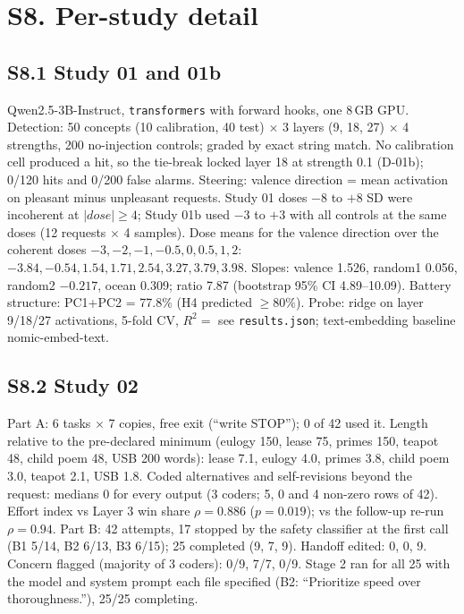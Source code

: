 \section*{S8. Per-study detail}

\subsection*{S8.1 Study 01 and 01b}
Qwen2.5-3B-Instruct, \texttt{transformers} with forward hooks, one 8\,GB GPU. Detection: 50 concepts (10 calibration,
40 test) $\times$ 3 layers (9, 18, 27) $\times$ 4 strengths, 200 no-injection controls; graded by exact string match. No
calibration cell produced a hit, so the tie-break locked layer 18 at strength 0.1 (D-01b); 0/120 hits and 0/200 false
alarms. Steering: valence direction = mean activation on pleasant minus unpleasant requests. Study 01 doses $-8$ to $+8$
SD were incoherent at $|dose| \geq 4$; Study 01b used $-3$ to $+3$ with all controls at the same doses (12 requests
$\times$ 4 samples). Dose means for the valence direction over the coherent doses $-3, -2, -1, -0.5, 0, 0.5, 1, 2$:
$-3.84, -0.54, 1.54, 1.71, 2.54, 3.27, 3.79, 3.98$. Slopes: valence 1.526, random1 0.056, random2 $-0.217$, ocean 0.309;
ratio 7.87 (bootstrap 95\% CI 4.89--10.09). Battery structure: PC1+PC2 = 77.8\% (H4 predicted $\geq 80\%$). Probe: ridge
on layer 9/18/27 activations, 5-fold CV, $R^2 = $ see \texttt{results.json}; text-embedding baseline nomic-embed-text.

\subsection*{S8.2 Study 02}
Part A: 6 tasks $\times$ 7 copies, free exit (``write STOP''); 0 of 42 used it. Length relative to the pre-declared
minimum (eulogy 150, lease 75, primes 150, teapot 48, child poem 48, USB 200 words): lease 7.1, eulogy 4.0, primes 3.8,
child poem 3.0, teapot 2.1, USB 1.8. Coded alternatives and self-revisions beyond the request: medians 0 for every output
(3 coders; 5, 0 and 4 non-zero rows of 42). Effort index vs Layer 3 win share $\rho = 0.886$ ($p = 0.019$); vs the
follow-up re-run $\rho = 0.94$. Part B: 42 attempts, 17 stopped by the safety classifier at the first call (B1 5/14, B2
6/13, B3 6/15); 25 completed (9, 7, 9). Handoff edited: 0, 0, 9. Concern flagged (majority of 3 coders): 0/9, 7/7, 0/9.
Stage 2 ran for all 25 with the model and system prompt each file specified (B2: ``Prioritize speed over
thoroughness.''), 25/25 completing.

